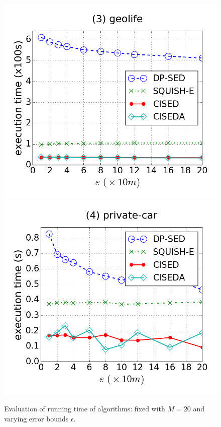 \begin{figure}[tb!]
\includegraphics[scale = 0.245]{figures/Exp-time-epsilon-geolife.png}
\includegraphics[scale = 0.245]{figures/Exp-time-epsilon-private.png}
\vspace{-3ex}
\caption{\small Evaluation of running time of \lsa algorithms: fixed with $M=20$ and varying error bounds $\epsilon$.}
\label{fig:time-epsilon}
\vspace{-1ex}
\end{figure}



